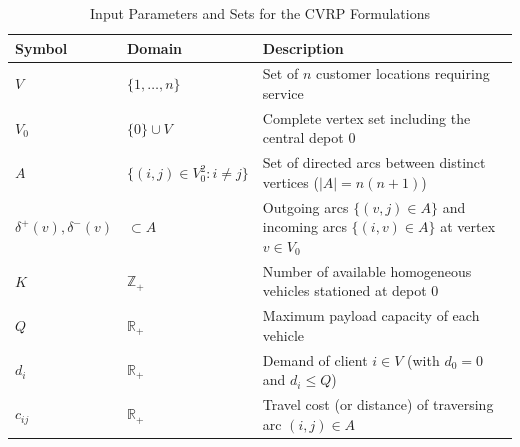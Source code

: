\documentclass[11pt,a4paper]{article}
\begin{document}
\begin{table}[htbp]
\centering
\caption{Input Parameters and Sets for the CVRP Formulations}
\label{tab:notation}
\small
\begin{tabular}{llp{10.5cm}}
\toprule
\textbf{Symbol} & \textbf{Domain} & \textbf{Description} \\
\midrule
$V$ & $\{1, \dots, n\}$ & Set of $n$ customer locations requiring service \\
$V_0$ & $\{0\} \cup V$ & Complete vertex set including the central depot $0$ \\
$A$ & $\{(i,j) \in V_0^2 : i \neq j\}$ & Set of directed arcs between distinct vertices ($|A| = n(n+1)$) \\
$\delta^+(v), \delta^-(v)$ & $\subset A$ & Outgoing arcs $\{(v, j) \in A\}$ and incoming arcs $\{(i, v) \in A\}$ at vertex $v \in V_0$ \\
$K$ & $\mathbb{Z}_+$ & Number of available homogeneous vehicles stationed at depot $0$ \\
$Q$ & $\mathbb{R}_+$ & Maximum payload capacity of each vehicle \\
$d_i$ & $\mathbb{R}_+$ & Demand of client $i \in V$ (with $d_0 = 0$ and $d_i \le Q$) \\
$c_{ij}$ & $\mathbb{R}_+$ & Travel cost (or distance) of traversing arc $(i, j) \in A$ \\
\bottomrule
\end{tabular}
\end{table}
\end{document}
